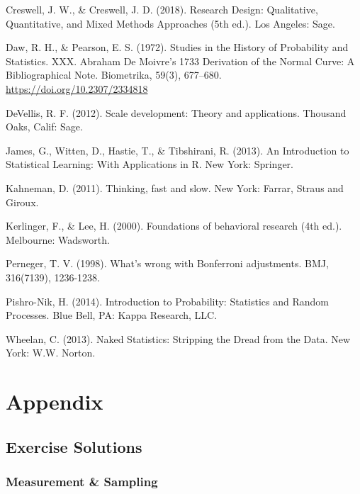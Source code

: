 \documentclass[]{book}
\begin{document}
Creswell, J. W., \& Creswell, J. D. (2018). Research Design: Qualitative, Quantitative, and Mixed Methods Approaches (5th ed.). Los Angeles: Sage.

Daw, R. H., \& Pearson, E. S. (1972). Studies in the History of Probability and Statistics. XXX. Abraham De Moivre's 1733 Derivation of the Normal Curve: A Bibliographical Note. Biometrika, 59(3), 677--680. \url{https://doi.org/10.2307/2334818}

DeVellis, R. F. (2012). Scale development: Theory and applications. Thousand Oaks, Calif: Sage.

James, G., Witten, D., Hastie, T., \& Tibshirani, R. (2013). An Introduction to Statistical Learning: With Applications in R. New York: Springer.

Kahneman, D. (2011). Thinking, fast and slow. New York: Farrar, Straus and Giroux.

Kerlinger, F., \& Lee, H. (2000). Foundations of behavioral research (4th ed.). Melbourne: Wadsworth.

Perneger, T. V. (1998). What's wrong with Bonferroni adjustments. BMJ, 316(7139), 1236-1238.

Pishro-Nik, H. (2014). Introduction to Probability: Statistics and Random Processes. Blue Bell, PA: Kappa Research, LLC.

Wheelan, C. (2013). Naked Statistics: Stripping the Dread from the Data. New York: W.W. Norton.

\hypertarget{appendix}{%
\chapter{Appendix}\label{appendix}}

\hypertarget{solutions}{%
\section{Exercise Solutions}\label{solutions}}

\hypertarget{measurement-sampling}{%
\subsection{Measurement \& Sampling}\label{measurement-sampling}}
\end{document}
